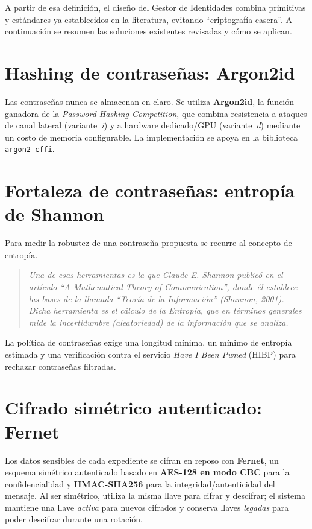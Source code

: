 \documentclass[10pt,letterpaper]{report}
\newenvironment{citaliteral}
  {\begin{quote}\itshape\color{citblue}}
  {\end{quote}}
\renewcommand{\_}{\textunderscore\allowbreak}
\begin{document}
A partir de esa definici\'on, el dise\~no del Gestor de Identidades combina
primitivas y est\'andares ya establecidos en la literatura, evitando
``criptograf\'ia casera''. A continuaci\'on se resumen las soluciones existentes
revisadas y c\'omo se aplican.

\section{Hashing de contrase\~nas: Argon2id}
Las contrase\~nas nunca se almacenan en claro. Se utiliza \textbf{Argon2id}, la
funci\'on ganadora de la \textit{Password Hashing Competition}, que combina
resistencia a ataques de canal lateral (variante~\textit{i}) y a hardware
dedicado/GPU (variante~\textit{d}) mediante un costo de memoria configurable. La
implementaci\'on se apoya en la biblioteca \texttt{argon2-cffi}.

\section{Fortaleza de contrase\~nas: entrop\'ia de Shannon}
Para medir la robustez de una contrase\~na propuesta se recurre al concepto de
entrop\'ia.

\begin{citaliteral}
Una de esas herramientas es la que Claude E. Shannon public\'o en el art\'iculo
``A Mathematical Theory of Communication'', donde \'el establece las bases de la
llamada ``Teor\'ia de la Informaci\'on'' (Shannon, 2001). Dicha herramienta es el
c\'alculo de la Entrop\'ia, que en t\'erminos generales mide la incertidumbre
(aleatoriedad) de la informaci\'on que se analiza.
\end{citaliteral}

La pol\'itica de contrase\~nas exige una longitud m\'inima, un m\'inimo de
entrop\'ia estimada y una verificaci\'on contra el servicio
\textit{Have I Been Pwned} (HIBP) para rechazar contrase\~nas filtradas.

\section{Cifrado sim\'etrico autenticado: Fernet}
Los datos sensibles de cada expediente se cifran en reposo con \textbf{Fernet},
un esquema sim\'etrico autenticado basado en \textbf{AES-128 en modo CBC} para la
confidencialidad y \textbf{HMAC-SHA256} para la integridad/autenticidad del
mensaje. Al ser sim\'etrico, utiliza la misma llave para cifrar y descifrar; el
sistema mantiene una llave \textit{activa} para nuevos cifrados y conserva
llaves \textit{legadas} para poder descifrar durante una rotaci\'on.
\end{document}

